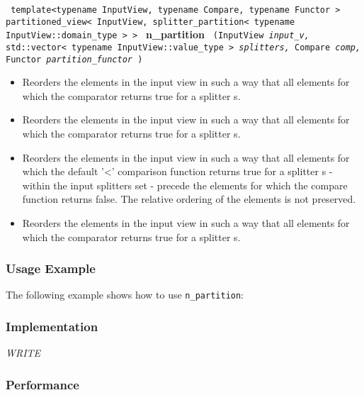 \noindent
\texttt{%
template<typename InputView, typename Compare, typename Functor >
\newline
partitioned\_view< InputView, splitter\_partition< typename 
    InputView::domain\_type > > 
}
\newline
\textbf{n\_partition}%
\texttt{%
(InputView 
\textit{input\_v,}%
std::vector< typename InputView::value\_type > 
\textit{splitters,}%
Compare 
\textit{comp,}%
Functor 
\textit{partition\_functor}%
)
}

\begin{itemize}
\item
Reorders the elements in the input view in such a way that all elements for which the comparator returns true for a splitter s. 
\item
Reorders the elements in the input view in such a way that all elements for which the comparator returns true for a splitter s. 
\item
Reorders the elements in the input view in such a way that all elements for which the default '<' comparison function returns true for a splitter s - within the input splitters set - precede the elements for which the compare function returns false. The relative ordering of the elements is not preserved. 
\item
Reorders the elements in the input view in such a way that all elements for which the comparator returns true for a splitter s. 
\end{itemize}

\subsubsection{Usage Example} %

The following example shows how to use \texttt{n\_partition}:

 
\subsubsection{Implementation} %

\textit{WRITE}

\subsubsection{Performance} %

